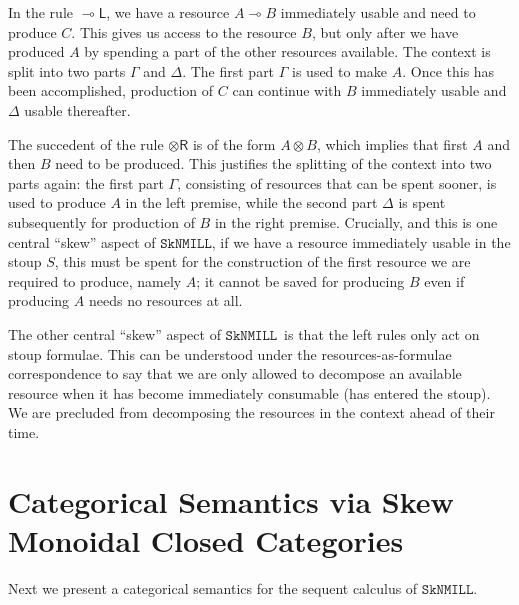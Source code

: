 \documentclass[copyright,creativecommons]{eptcs}
\theoremstyle{definition}
\newcommand{\tr}{\otimes \mathsf{R}}
\newcommand{\lleft}{{\multimap}\mathsf{L}}
\newcommand{\ot}{\otimes}
\newcommand{\lolli}{\multimap}
\newcommand{\SkNMILL}{$\mathtt{SkNMILL}$}
\begin{document}
In the rule $\lleft$, we have a resource $A
\lolli B$ immediately usable and need to produce $C$. This gives us
access to the resource $B$, but only after we have produced $A$ by spending a part of the other resources available.  The context is split into two parts $\Gamma$ and $\Delta$. The first part $\Gamma$ is used to make $A$. Once this has been accomplished, production of $C$ can continue with $B$ immediately usable and $\Delta$ usable thereafter.

The succedent of the rule $\tr$ is of the form $A \ot B$, which
implies that first $A$ and then $B$ need to be produced. This justifies the
splitting of the context into two parts again: the first part $\Gamma$, consisting of
resources that can be spent sooner, is used to produce $A$ in the left
premise, while the second part $\Delta$ is spent subsequently for production of $B$ in the
right premise. Crucially, and this is one central ``skew'' aspect
of \SkNMILL, if we have a resource immediately usable in the
stoup $S$, this must be spent for the construction of the first resource
we are required to produce, namely $A$; it cannot be saved for producing $B$ even if producing $A$ needs no resources at all.

The other central ``skew'' aspect of \SkNMILL\ is that the left
rules only act on stoup formulae. This can be understood under the
resources-as-formulae correspondence to say that we are only allowed to
decompose an available resource when it has become immediately consumable (has entered the stoup). We are precluded from decomposing the
resources in the context ahead of their time. 



\section{Categorical Semantics via Skew Monoidal Closed Categories}
\label{sec:catsem}

Next we present a categorical semantics for the sequent calculus of \SkNMILL.
\end{document}
